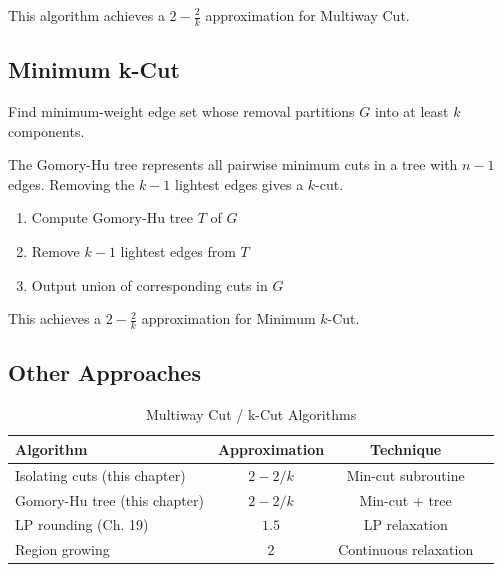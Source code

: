 \begin{theorem}
This algorithm achieves a $2 - \frac{2}{k}$ approximation for Multiway Cut.
\end{theorem}

\subsection{Minimum k-Cut}

\begin{definition}[$k$-Cut]
Find minimum-weight edge set whose removal partitions $G$ into at least $k$ components.
\end{definition}

The Gomory-Hu tree represents all pairwise minimum cuts in a tree with $n-1$ edges. Removing the $k-1$ lightest edges gives a $k$-cut.

\begin{algorithmdef}
\begin{enumerate}
    \item Compute Gomory-Hu tree $T$ of $G$
    \item Remove $k-1$ lightest edges from $T$
    \item Output union of corresponding cuts in $G$
\end{enumerate}
\end{algorithmdef}

\begin{theorem}
This achieves a $2 - \frac{2}{k}$ approximation for Minimum $k$-Cut.
\end{theorem}

\subsection{Other Approaches}

\begin{table}[H]
\centering
\caption{Multiway Cut / k-Cut Algorithms}
\begin{tabular}{lccc}
\toprule
Algorithm & Approximation & Technique \\
\midrule
Isolating cuts (this chapter) & $2-2/k$ & Min-cut subroutine \\
Gomory-Hu tree (this chapter) & $2-2/k$ & Min-cut + tree \\
LP rounding (Ch. 19) & $1.5$ & LP relaxation \\
Region growing & $2$ & Continuous relaxation \\
\bottomrule
\end{tabular}
\end{table}

